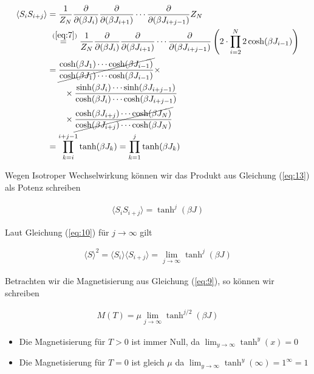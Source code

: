 \begin{align}
  \label{eq:13}
  \langle S_iS_{i+j}\rangle &=  \frac{1}{Z_N} \pdiff_{(\beta J_i)}\pdiff_{(\beta J_{i+1})}\cdots \pdiff_{(\beta J_{i+j-1})} Z_N \notag\\
&\stackrel{~(\ref{eq:7})}=  \frac{1}{Z_N} \pdiff_{(\beta J_i)}\pdiff_{(\beta J_{i+1})}\cdots \pdiff_{(\beta J_{i+j-1})} \left(2\cdot\prod_{i=2}^N2\cosh( \beta J_{i-1})\right)  \notag\\
&=\cancel{\frac{\cosh(\beta J_{1})\cdots \cosh(\beta J_{i-1})}{ \cosh(\beta J_{1})\cdots \cosh(\beta J_{i-1})} } \times\notag \\
&\qquad\times \frac{ \sinh(\beta J_{i})\cdots\sinh(\beta J_{i+j-1})}{\cosh(\beta J_{i})\cdots\cosh(\beta J_{i+j-1})}\notag \\
&\qquad \times \cancel{ \frac{  \cosh(\beta J_{i+j}) \cdots \cosh(\beta J_{N})  }{   \cosh(\beta J_{i+j}) \cdots \cosh(\beta J_{N}) }} \notag\\
%
&=\prod_{k=i}^{i+j-1} \tanh(\beta J_{k}) = \prod_{k=1}^{j} \tanh(\beta J_{k})
\end{align}

Wegen Isotroper Wechselwirkung können wir das Produkt aus Gleichung (\ref{eq:13}) als Potenz schreiben

\begin{align}
  \label{eq:14}
   \langle S_iS_{i+j}\rangle =  \tanh^j(\beta J)
\end{align}

Laut Gleichung (\ref{eq:10}) für \(j\to\infty\) gilt

\begin{align}
  \label{eq:15}
\langle S \rangle^2 =  \langle S_i\rangle\langle S_{i+j}\rangle = \lim_{j\to\infty} \tanh^j(\beta J)
\end{align}

Betrachten wir die Magnetisierung aus Gleichung (\ref{eq:9}), so können wir schreiben

\begin{align}
  \label{eq:16}
  M(T) = \mu \lim_{j\to\infty} \tanh^{j/2}(\beta J)
\end{align}

\begin{itemize}
\item Die Magnetisierung für \(T>0\) ist immer Null, da \(\lim_{y\to\infty}\tanh^y(x)=0\)
\item Die Magnetisierung für \(T=0\) ist gleich \(\mu\) da \(\lim_{y\to\infty}\tanh^y(\infty)=1^\infty=1\)
\end{itemize}


